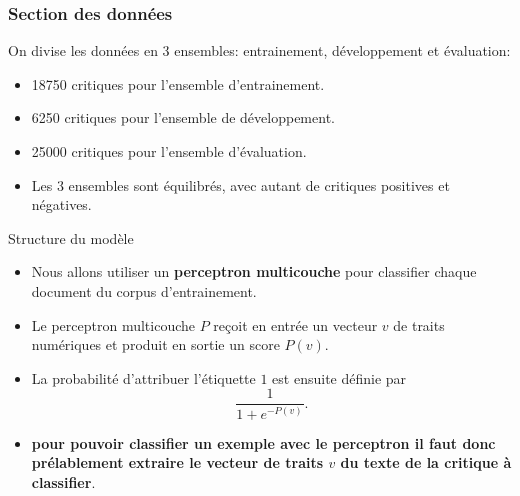 \documentclass{beamer}
\begin{document}
\begin{frame}
  \frametitle{Section des donn\'ees}
  On divise les donn\'ees en 3 ensembles: entrainement, d\'eveloppement et \'evaluation: 
  \begin{itemize}
  \item 18750 critiques pour l'ensemble d'entrainement.
  \item 6250 critiques pour l'ensemble de d\'eveloppement.
  \item 25000 critiques pour l'ensemble d'\'evaluation.
  \item Les 3 ensembles sont \'equilibr\'es, avec autant de critiques positives et n\'egatives.
  \end{itemize}
\end{frame}



\begin{frame}{Structure du mod\`ele}
  \begin{itemize}
  \item Nous allons utiliser un {\bf perceptron multicouche} pour classifier chaque document du corpus d'entrainement.
  \item Le perceptron multicouche $P$ re\c coit en entr\'ee un vecteur $v$ de traits num\'eriques et produit en sortie un score $P(v)$.
  \item La probabilit\'e d'attribuer l'\'etiquette $1$ est ensuite d\'efinie par \[\frac{1}{1 + e^{-P(v)}}.\]
  \item {\bf pour pouvoir classifier un exemple avec le perceptron il faut donc pr\'elablement extraire le vecteur de traits $v$ du texte de la critique \`a classifier}.
  \end{itemize}
\end{frame}
\end{document}
